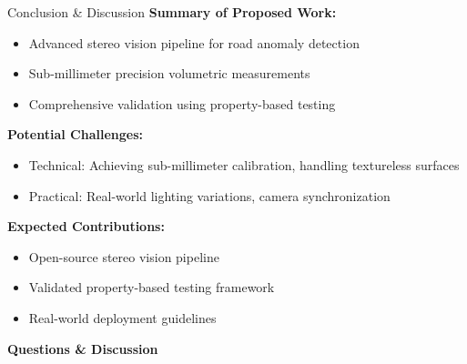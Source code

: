 \documentclass[aspectratio=169]{beamer}
\begin{document}
\begin{frame}{Conclusion \& Discussion}
\textbf{Summary of Proposed Work:}
\begin{itemize}
\item Advanced stereo vision pipeline for road anomaly detection
\item Sub-millimeter precision volumetric measurements
\item Comprehensive validation using property-based testing
\end{itemize}

\vspace{0.5cm}

\textbf{Potential Challenges:}
\begin{itemize}
\item Technical: Achieving sub-millimeter calibration, handling textureless surfaces
\item Practical: Real-world lighting variations, camera synchronization
\end{itemize}

\vspace{0.5cm}

\textbf{Expected Contributions:}
\begin{itemize}
\item Open-source stereo vision pipeline
\item Validated property-based testing framework
\item Real-world deployment guidelines
\end{itemize}

\vspace{0.5cm}

\begin{center}
\textbf{Questions \& Discussion}
\end{center}
\end{frame}
\end{document}
